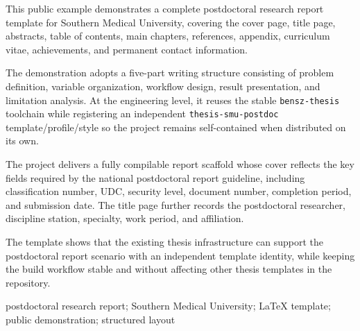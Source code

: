 This public example demonstrates a complete postdoctoral research report template for Southern Medical University, covering the cover page, title page, abstracts, table of contents, main chapters, references, appendix, curriculum vitae, achievements, and permanent contact information.

The demonstration adopts a five-part writing structure consisting of problem definition, variable organization, workflow design, result presentation, and limitation analysis. At the engineering level, it reuses the stable \texttt{bensz-thesis} toolchain while registering an independent \texttt{thesis-smu-postdoc} template/profile/style so the project remains self-contained when distributed on its own.

The project delivers a fully compilable report scaffold whose cover reflects the key fields required by the national postdoctoral report guideline, including classification number, UDC, security level, document number, completion period, and submission date. The title page further records the postdoctoral researcher, discipline station, specialty, work period, and affiliation.

The template shows that the existing thesis infrastructure can support the postdoctoral report scenario with an independent template identity, while keeping the build workflow stable and without affecting other thesis templates in the repository.

postdoctoral research report; Southern Medical University; LaTeX template; public demonstration; structured layout
